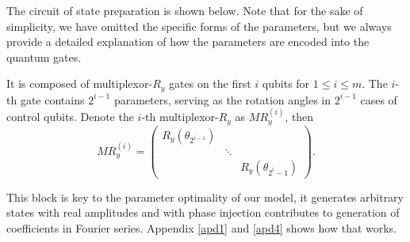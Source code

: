 \documentclass{article}
\theoremstyle{plain}
\theoremstyle{definition}
\theoremstyle{remark}
\begin{document}
The circuit of state preparation is shown below. Note that for the sake of simplicity, we have omitted the specific forms of the parameters, but we always provide a detailed explanation of how the parameters are encoded into the quantum gates.
 \begin{center}
    \end{center} 
It is composed of multiplexor-$R_y$ gates on the first $i$ qubits for $1\leq i\leq m$. The $i$-th gate contains $2^{i-1}$ parameters, serving as the rotation angles in $2^{i-1}$ cases of control qubits. Denote the $i$-th multiplexor-$R_y$ as $MR_y^{(i)}$, then
\begin{equation*}
    MR_y^{(i)} = 
    \begin{pmatrix}
        R_y(\theta_{2^{i-1}})&& \\
        &\ddots&\\
        &&R_y(\theta_{2^{i}-1})
    \end{pmatrix}.
\end{equation*}

This block is key to the parameter optimality of our model, it generates arbitrary states with real amplitudes and with phase injection contributes to generation of coefficients in Fourier series. Appendix \ref{apd1} and \ref{apd4} shows how that works.
\end{document}
